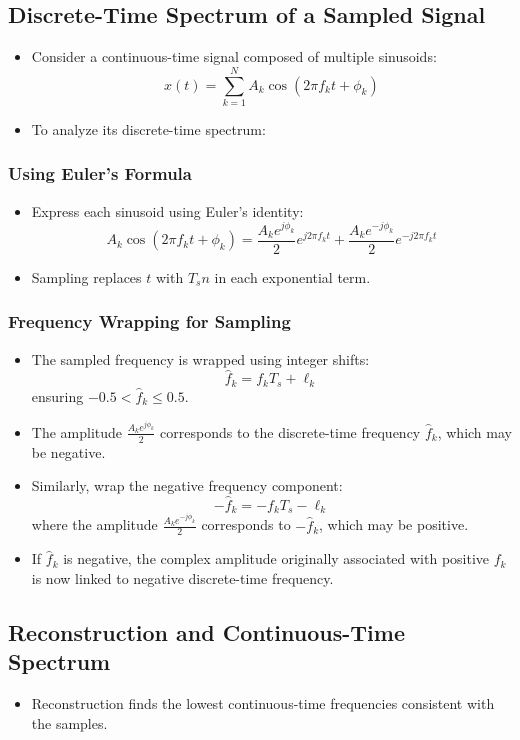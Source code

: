 \documentclass[12pt, letterpaper]{article}
\begin{document}
\subsection{Discrete-Time Spectrum of a Sampled Signal}
\begin{itemize}
    \item Consider a continuous-time signal composed of multiple sinusoids:
    \[
    x(t) = \sum_{k=1}^{N} A_k \cos(2\pi f_k t + \phi_k)
    \]
    \item To analyze its discrete-time spectrum:
\end{itemize}

\subsubsection{Using Euler’s Formula}
\begin{itemize}
    \item Express each sinusoid using Euler’s identity:
    \[
    A_k \cos(2\pi f_k t + \phi_k) = \frac{A_k e^{j\phi_k}}{2} e^{j 2\pi f_k t} + \frac{A_k e^{-j\phi_k}}{2} e^{-j 2\pi f_k t}
    \]
    \item Sampling replaces \( t \) with \( T_s n \) in each exponential term.
\end{itemize}

\subsubsection{Frequency Wrapping for Sampling}
\begin{itemize}
    \item The sampled frequency is wrapped using integer shifts:
    \[
    \hat{f}_k = f_k T_s + \ell_k
    \]
    ensuring \( -0.5 < \hat{f}_k \leq 0.5 \).
    \item The amplitude \( \frac{A_k e^{j\phi_k}}{2} \) corresponds to the discrete-time frequency \( \hat{f}_k \), which may be negative.
    \item Similarly, wrap the negative frequency component:
    \[
    -\hat{f}_k = -f_k T_s - \ell_k
    \]
    where the amplitude \( \frac{A_k e^{-j\phi_k}}{2} \) corresponds to \( -\hat{f}_k \), which may be positive.
    \item If \( \hat{f}_k \) is negative, the complex amplitude originally associated with positive \( f_k \) is now linked to negative discrete-time frequency.
\end{itemize}

\subsection{Reconstruction and Continuous-Time Spectrum}
\begin{itemize}
    \item Reconstruction finds the lowest continuous-time frequencies consistent with the samples.
\end{itemize}
\end{document}
